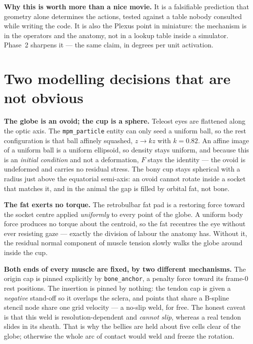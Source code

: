 \documentclass[11pt,a4paper]{article}
\newcommand{\code}[1]{\texttt{#1}}
\begin{document}
\begin{tcolorbox}[colback=good!5,colframe=good!45,boxrule=0.7pt,arc=2pt]
\textbf{Why this is worth more than a nice movie.} It is a falsifiable prediction that geometry
alone determines the actions, tested against a table nobody consulted while writing the code. It is
also the Plexus point in miniature: the mechanism is in the operators and the anatomy, not in a
lookup table inside a simulator. Phase~2 sharpens it --- the same claim, in degrees per unit
activation.
\end{tcolorbox}

\section{Two modelling decisions that are not obvious}

\textbf{The globe is an ovoid; the cup is a sphere.} Teleost eyes are flattened along the optic
axis. The \code{mpm\_particle} entity can only seed a uniform ball, so the rest configuration is
that ball affinely squashed, $z\to kz$ with $k=0.82$. An affine image of a uniform ball is a uniform
ellipsoid, so density stays uniform, and because this is an \emph{initial condition} and not a
deformation, $F$ stays the identity --- the ovoid is undeformed and carries no residual stress. The
bony cup stays spherical with a radius just above the equatorial semi-axis: an ovoid cannot rotate
inside a socket that matches it, and in the animal the gap is filled by orbital fat, not bone.

\textbf{The fat exerts no torque.} The retrobulbar fat pad is a restoring force toward the socket
centre applied \emph{uniformly} to every point of the globe. A uniform body force produces no torque
about the centroid, so the fat recentres the eye without ever resisting gaze --- exactly the division
of labour the anatomy has. Without it, the residual normal component of muscle tension slowly walks
the globe around inside the cup.

\textbf{Both ends of every muscle are fixed, by two different mechanisms.} The origin cap is pinned
explicitly by \code{bone\_anchor}, a penalty force toward its frame-0 rest positions. The insertion
is pinned by nothing: the tendon cap is given a \emph{negative} stand-off so it overlaps the sclera,
and points that share a B-spline stencil node share one grid velocity --- a no-slip weld, for free.
The honest caveat is that this weld is resolution-dependent and \emph{cannot slip}, whereas a real
tendon slides in its sheath. That is why the bellies are held about five cells clear of the globe;
otherwise the whole arc of contact would weld and freeze the rotation.
\end{document}
